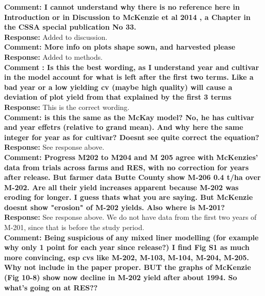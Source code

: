 \documentclass{article} \usepackage[margin=1in]{geometry}
\begin{document}
\textbf{Comment: I cannot understand why there is no reference here in
  Introduction or in Discussion to McKenzie et al 2014 , a Chapter in
  the CSSA special publication No 33.}\\

\textbf{Response: } Added to discussion.\\

\textbf{Comment: More info on plots shape sown, and harvested please}\\

\textbf{Response: } Added to methods.\\

\textbf{Comment : Is this the best wording, as I understand year and
  cultivar in the model account for what is left after the first two
  terms. Like a bad year or a low yielding cv (maybe high quality)
  will cause a deviation of plot yield from that explained by the
  first 3 terms}\\

\textbf{Response: } This is the correct wording.\\

\textbf{Comment: is this the same as the McKay model? No, he has
  cultivar and year effetrs (relative to grand mean). And why here the
  same integer for year as for cultivar? Doesnt see quite correct the
  equation?}\\

\textbf{Response: } See response above.\\

\textbf{Comment: Progress M202 to M204 and M 205 agree with McKenzies'
  data from trials across farms and RES, with no correction for years
  after release.  But farmer data Butte County show M-206 0.4 t/ha
  over M-202. Are all their yield increases apparent because M-202 was
  eroding for longer. I guess thats what you are saying. But McKenzie
  doesnt show "erosion" of M-202 yields. Also where is M-201?}\\

\textbf{Response: } See response above. We do not have data from the
first two years of M-201, since that is before the study period.\\

\textbf{Comment: Being suspicious of any mixed liner modelling (for
  example why only 1 point for each year since release?) I find Fig S1
  as much more convincing, esp cvs like M-202, M-103, M-104, M-204,
  M-205. Why not include in the paper proper.  BUT the graphs of
  McKenzie (Fig 10-8) show now decline in M-202 yield after about
  1994. So what's going on at RES??}\\
\end{document}
